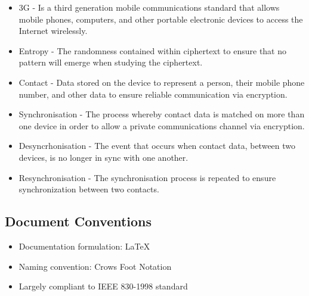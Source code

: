 \begin{itemize}
\item 3G - Is a third generation mobile communications standard that allows mobile phones, computers, and other portable electronic devices to access the Internet wirelessly.
\item Entropy -  The randomness contained within ciphertext to ensure that no pattern will emerge when studying the ciphertext.
\item Contact - Data stored on the device to represent a person, their mobile phone number, and other data to ensure reliable communication via encryption.
\item Synchronisation - The process whereby contact data is matched on more than one device in order to allow a private communications channel via encryption.
\item Desyncrhonisation - The event that occurs when contact data, between two devices, is no longer in sync with one another.
\item Resynchronisation - The synchronisation process is repeated to ensure synchronization between two contacts.

\end{itemize}

\subsection{Document Conventions}
\begin{itemize}
\item Documentation formulation: LaTeX
\item Naming convention: Crows Foot Notation
\item Largely compliant to IEEE 830-1998 standard
\end{itemize}

